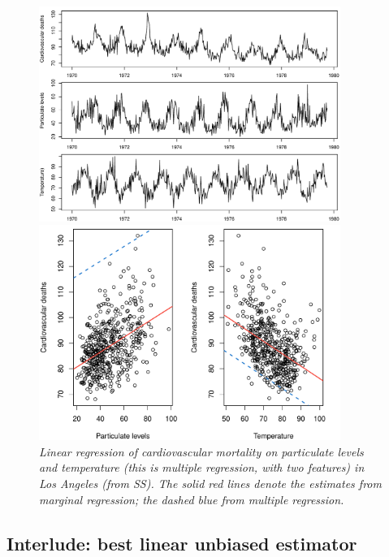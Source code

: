 \documentclass{article}
\begin{document}
\begin{figure}[p]
\centering
\includegraphics[width=0.875\textwidth]{fig/cardio-3.pdf} 

\bigskip\bigskip
\includegraphics[width=0.875\textwidth]{fig/cardio-4.pdf}
\caption{\it Linear regression of cardiovascular mortality on particulate levels
  and temperature (this is multiple regression, with two features) in Los
  Angeles (from SS). The solid red lines denote the estimates from marginal
  regression; the dashed blue from multiple regression.} 
\label{fig:cardio_mult}
\end{figure}

\subsection{Interlude: best linear unbiased estimator}

\def\WN{\mathrm{WN}}
\def\MSE{\mathrm{MSE}}
\end{document}
